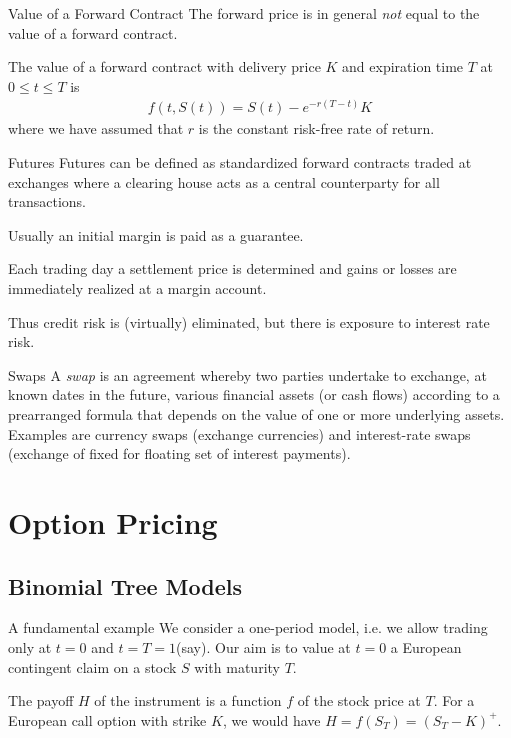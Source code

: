 Value of a Forward Contract
	The forward price is in general \emph{not} equal to the value of a forward
	contract.
	
	The value of a forward contract with delivery price $K$ and expiration time $T$
	at $0\leq t \leq T$ is
		\begin{align*}
			f(t,S(t)) = S(t) - e^{-r(T-t)}K
		\end{align*}
	where we have assumed that $r$ is the constant risk-free rate of return.


Futures
	Futures can be defined as standardized forward contracts traded at
	exchanges where a clearing house acts as a central counterparty for all transactions.
	
	Usually an initial margin is paid as a guarantee.
	
	Each trading day a settlement price is determined and gains or losses are immediately realized at a margin account.
	
	Thus credit risk is (virtually) eliminated, but there is exposure to
	interest rate risk.



Swaps
A {\it swap} is an agreement whereby two parties
undertake to exchange, at known dates in the future, various
financial assets (or cash flows) according to a prearranged
formula that depends on the value of one or more underlying
assets. Examples are currency swaps (exchange currencies) and
interest-rate swaps (exchange of fixed for floating set of
interest payments).


\section{Option Pricing}
\subsection{Binomial Tree Models}

A fundamental example
	We consider a one-period model, i.e. we allow trading only at $t=0$ and $t=T=1$(say).
		Our aim is to value at $t=0$  a European contingent claim on a stock $S$
		with maturity $T$.
		
		The payoff $H$ of the instrument is a function $f$ of the stock price at
		$T$. For a European call option with strike $K$, we would have
		$H=f(S_T)=(S_T-K)^+$.
		
